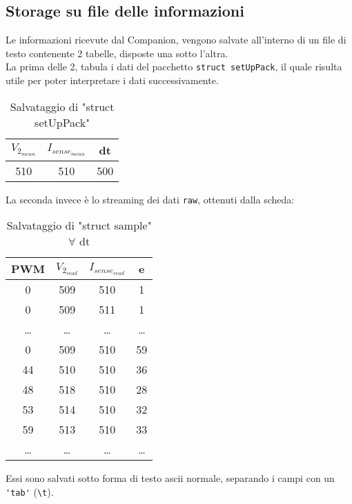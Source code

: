 \subsection{Storage su file delle informazioni}\label{subsec:experimentStorage}
Le informazioni ricevute dal Companion, vengono salvate all'interno di un file di testo contenente 2 tabelle, disposte una sotto l'altra.\\
La prima delle 2, tabula i dati del pacchetto \verb|struct setUpPack|, il quale risulta utile per poter interpretare i dati successivamente.
\begin{table}[H]
	\centering
	\caption[Salvataggio di "struct setUpPack"]{Salvataggio di "struct setUpPack"}
	\begin{tabular}[t]{|c|c|c|}
		\hline
		$ V_{2_{mean}} $ & $ I_{sense_{mean}}$ & dt  \\
		\hline
		510              & 510                 & 500 \\
		\hline
	\end{tabular}
\end{table}

\noindent
La seconda invece è lo streaming dei dati \verb|raw|, ottenuti dalla scheda:
\begin{table}[H]
	\centering
	\caption[Salvataggio di "struct sample" $\forall$ dt]{Salvataggio di "struct sample" $\forall$ dt}
	\begin{tabular}[t]{|c|c|c|c|}
		\hline
		PWM   & $ V_{2_{read}}$ & $ I_{sense_{read}}$ & e     \\
		\hline
		0     & 509             & 510                 & 1     \\
		0     & 509             & 511                 & 1     \\
		\dots & \dots           & \dots               & \dots \\
		0     & 509             & 510                 & 59    \\
		44    & 510             & 510                 & 36    \\
		48    & 518             & 510                 & 28    \\
		53    & 514             & 510                 & 32    \\
		59    & 513             & 510                 & 33    \\
		\dots & \dots           & \dots               & \dots \\
		\hline
	\end{tabular}

\end{table}
\noindent
Essi sono salvati sotto forma di testo ascii normale, separando i campi con un \verb|'tab'| (\verb|\t|).

